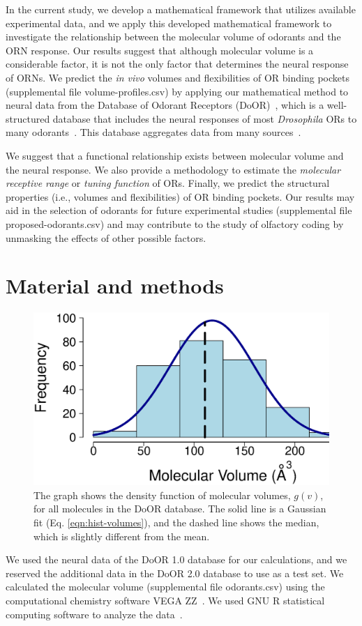 \documentclass[fleqn,11pt]{wlscirep}
\begin{document}
In the current study, 
we develop a mathematical framework that utilizes available experimental data, and
we apply this developed mathematical framework to investigate the relationship between the molecular volume of odorants and the ORN response. 
Our results suggest that although molecular volume is a considerable factor, 
it is not the only factor that determines the neural response of ORNs.
We predict the {\it in vivo} volumes and flexibilities of OR binding pockets (supplemental file volume-profiles.csv) 
by applying our mathematical method to neural data from the Database of Odorant Receptors (DoOR)~\cite{Galizia2010}, 
which is a well-structured database that includes the neural responses of most \textit{Drosophila} ORs to many odorants~\cite{Galizia2010}. 
This database aggregates data from many sources~\cite{Bruyne1999,Bruyne2001,Dobritsa2003,Goldman2005,Hallem2004,Hallem2006,
Kreher2005,Kreher2008,Kwon2007,Pelz2006,Pelz2006,Schmuker2007,Stensmyr2003,
Turner2009,VanderGoesvanNaters2007,Yao2005}.

We suggest that a functional relationship exists between molecular volume and the neural response. 
We also provide a methodology to estimate the {\it molecular receptive range} or {\it tuning function} of ORs.
Finally, we predict the structural properties (i.e., volumes and flexibilities) of OR binding pockets.
Our results may aid in the selection of odorants for future experimental studies (supplemental file proposed-odorants.csv) 
and may contribute to the study of olfactory coding by unmasking the effects of other possible factors.

\section*{Material and methods}
\begin{figure}
	\centering
	\includegraphics[width=0.5 \textwidth]{hist-volumes}
	\caption{The graph shows the density function of molecular volumes, $g(v)$, for all molecules in the DoOR database. 
	The solid line is a Gaussian fit (Eq. \ref{eqn:hist-volumes}), and the dashed line shows the median, 
	which is slightly different from the mean.}
	\label{fig:hist-volumes}
\end{figure}
We used the neural data of the DoOR 1.0 \cite{Galizia2010} database for our calculations, 
and we reserved the additional data in the DoOR 2.0 \cite{muench2015door, de2010,dweck2015,dweck2013,marshall2010,montague2011,Gabler2013} database to use as a test set.
We calculated the molecular volume (supplemental file odorants.csv) using the computational chemistry software VEGA ZZ~\cite{Pedretti2004}. 
We used GNU R statistical computing software to analyze the data~\cite{Rlanguage}.
\end{document}
